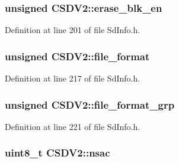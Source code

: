 \subsubsection[{\texorpdfstring{erase\+\_\+blk\+\_\+en}{erase\_blk\_en}}]{\setlength{\rightskip}{0pt plus 5cm}unsigned C\+S\+D\+V2\+::erase\+\_\+blk\+\_\+en}\hypertarget{struct_c_s_d_v2_abd116d457efa09f91c5fad2536718299}{}\label{struct_c_s_d_v2_abd116d457efa09f91c5fad2536718299}


Definition at line 201 of file Sd\+Info.\+h.

\subsubsection[{\texorpdfstring{file\+\_\+format}{file\_format}}]{\setlength{\rightskip}{0pt plus 5cm}unsigned C\+S\+D\+V2\+::file\+\_\+format}\hypertarget{struct_c_s_d_v2_ac1c316bc9b54c269007fb8e29f635508}{}\label{struct_c_s_d_v2_ac1c316bc9b54c269007fb8e29f635508}


Definition at line 217 of file Sd\+Info.\+h.

\subsubsection[{\texorpdfstring{file\+\_\+format\+\_\+grp}{file\_format\_grp}}]{\setlength{\rightskip}{0pt plus 5cm}unsigned C\+S\+D\+V2\+::file\+\_\+format\+\_\+grp}\hypertarget{struct_c_s_d_v2_a093e6982187fdc5ba9c787c014f6296c}{}\label{struct_c_s_d_v2_a093e6982187fdc5ba9c787c014f6296c}


Definition at line 221 of file Sd\+Info.\+h.

\subsubsection[{\texorpdfstring{nsac}{nsac}}]{\setlength{\rightskip}{0pt plus 5cm}uint8\+\_\+t C\+S\+D\+V2\+::nsac}\hypertarget{struct_c_s_d_v2_a2fcdefca1df007ad0527d29af26c34ac}{}\label{struct_c_s_d_v2_a2fcdefca1df007ad0527d29af26c34ac}


